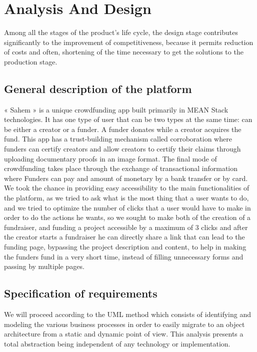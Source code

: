 

\setcounter{mtc}{9}
\chapter{Analysis And Design}%
\label{chap:chapter_two}
\minitoc
Among all the stages of the product's life cycle, the design stage contributes significantly to the improvement of competitiveness, because it permits reduction of costs and often, shortening of the time necessary to get the solutions to the production stage.

\section{General description of the platform}
« Sahem » is a unique crowdfunding app built primarily in MEAN Stack technologies. It has one type of user that can be two types at the same time: can be either a creator or a funder. A funder donates while a creator acquires the fund. This app has a trust-building mechanism called corroboration where funders can certify creators and allow creators to certify their claims through uploading documentary proofs in an image format. The final mode of crowdfunding takes place through the exchange of transactional information where Funders can pay and amount of monetary by a bank transfer or by card.
We took the chance in providing easy accessibility to the main functionalities of the platform, as we tried to ask what is the most thing that a user wants to do, and we tried to optimize the number of clicks that a user would have to make in order to do the actions he wants, so we sought to make both of the creation of a fundraiser, and funding a project accessible by a maximum of 3 clicks and after the creator starts a fundraiser he can directly share a link that can lead to the funding page, bypassing the project description and content, to help in making the funders fund in a very short time, instead of filling unnecessary forms and passing by multiple pages.

\section{Specification of requirements}
We will proceed according to the UML method which consists of identifying and modeling the various business processes in order to easily migrate to an object architecture from a static and dynamic point of view. This analysis presents a total abstraction being independent of any technology or implementation.

